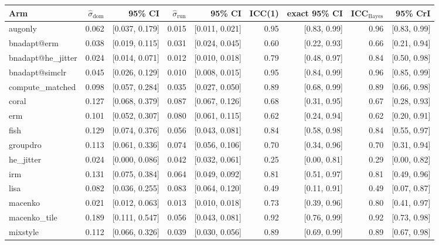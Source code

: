 \begin{tabular}{lrrrrrrrr}
\toprule
Arm & $\hat\sigma_\text{dom}$ & 95\% CI & $\hat\sigma_\text{run}$ & 95\% CI & ICC(1) & exact 95\% CI & ICC$_\text{Bayes}$ & 95\% CrI \\
\midrule
augonly & 0.062 & [0.037, 0.179] & 0.015 & [0.011, 0.021] & 0.95 & [0.83, 0.99] & 0.96 & [0.83, 0.99] \\
bnadapt@erm & 0.038 & [0.019, 0.115] & 0.031 & [0.024, 0.045] & 0.60 & [0.22, 0.93] & 0.66 & [0.21, 0.94] \\
bnadapt@he\_jitter & 0.024 & [0.014, 0.071] & 0.012 & [0.010, 0.018] & 0.79 & [0.48, 0.97] & 0.84 & [0.50, 0.98] \\
bnadapt@simclr & 0.045 & [0.026, 0.129] & 0.010 & [0.008, 0.015] & 0.95 & [0.84, 0.99] & 0.96 & [0.85, 0.99] \\
compute\_matched & 0.098 & [0.057, 0.284] & 0.035 & [0.027, 0.050] & 0.89 & [0.68, 0.99] & 0.89 & [0.66, 0.98] \\
coral & 0.127 & [0.068, 0.379] & 0.087 & [0.067, 0.126] & 0.68 & [0.31, 0.95] & 0.67 & [0.28, 0.93] \\
erm & 0.101 & [0.052, 0.307] & 0.080 & [0.061, 0.115] & 0.62 & [0.24, 0.94] & 0.62 & [0.20, 0.91] \\
fish & 0.129 & [0.074, 0.376] & 0.056 & [0.043, 0.081] & 0.84 & [0.58, 0.98] & 0.84 & [0.55, 0.97] \\
groupdro & 0.113 & [0.061, 0.336] & 0.074 & [0.056, 0.106] & 0.70 & [0.34, 0.96] & 0.70 & [0.31, 0.94] \\
he\_jitter & 0.024 & [0.000, 0.086] & 0.042 & [0.032, 0.061] & 0.25 & [0.00, 0.81] & 0.29 & [0.00, 0.82] \\
irm & 0.131 & [0.075, 0.384] & 0.064 & [0.049, 0.092] & 0.81 & [0.51, 0.97] & 0.81 & [0.49, 0.96] \\
lisa & 0.082 & [0.036, 0.255] & 0.083 & [0.064, 0.120] & 0.49 & [0.11, 0.91] & 0.49 & [0.07, 0.87] \\
macenko & 0.021 & [0.012, 0.063] & 0.013 & [0.010, 0.018] & 0.73 & [0.39, 0.96] & 0.80 & [0.41, 0.97] \\
macenko\_tile & 0.189 & [0.111, 0.547] & 0.056 & [0.043, 0.081] & 0.92 & [0.76, 0.99] & 0.92 & [0.73, 0.98] \\
mixstyle & 0.112 & [0.066, 0.326] & 0.039 & [0.030, 0.056] & 0.89 & [0.69, 0.99] & 0.89 & [0.67, 0.98] \\

\end{tabular}
